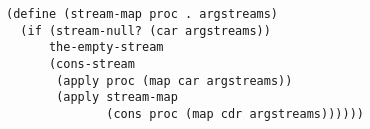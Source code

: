 \documentclass[a4paper,12pt]{article}
\begin{document}
\begin{lstlisting}
(define (stream-map proc . argstreams)
  (if (stream-null? (car argstreams))
      the-empty-stream
      (cons-stream
       (apply proc (map car argstreams))
       (apply stream-map
              (cons proc (map cdr argstreams))))))
\end{lstlisting}
\end{document}
